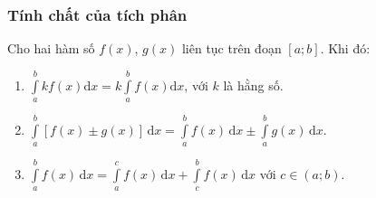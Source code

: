 \subsubsection{Tính chất của tích phân}
Cho hai hàm số $f(x)$, $g(x)$ liên tục trên đoạn $\left[a;b\right]$. Khi đó:
\begin{enumerate}
	\item $\displaystyle\int\limits_a^bkf(x)\mathrm{d}x=k\displaystyle\int\limits_a^bf(x)\mathrm{d}x$, với $k$ là hằng số.
	\item $\displaystyle\int\limits_a^b\left[f(x)\pm g(x)\right]\mathrm{\,d}x=\displaystyle\int\limits_a^b{f(x)\mathrm{\,d}x}\pm\displaystyle\int\limits_a^bg(x)\mathrm{\,d}x$.
	\item $\displaystyle\int\limits_a^bf(x)\mathrm{\,d}x=\displaystyle\int\limits_a^cf(x)\mathrm{\,d}x+\displaystyle\int\limits_c^bf(x)\mathrm{\,d}x$ với $c\in\left(a;b\right)$.
\end{enumerate}
